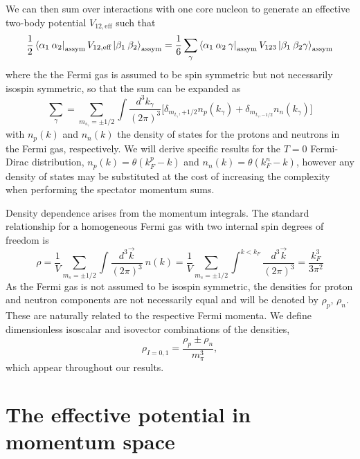 We can then sum over interactions with one core nucleon to generate an effective two-body potential $V_{12,\text{eff}}$ such that
\begin{equation}
\frac{1}{2} \bra{\alpha_1\:\alpha_2}_{\text{assym}}  V_{12,\text{eff}}\ket{\beta_1 \:\beta_2 }_{\text{assym}}=\frac{1}{6} \sum_{\gamma} \bra{\alpha_1\:\alpha_2 \: \gamma}_{\text{assym}} V_{123}  \ket{\beta_1 \:\beta_2 \gamma}_{\text{assym}}
\end{equation}
where the the Fermi gas is assumed to be spin symmetric but not necessarily isospin symmetric, so that the sum can be expanded as
\begin{equation}
\sum_\gamma=\sum_{m_{s_\gamma}=\pm 1/2}\int \frac{d^3k_\gamma}{(2\pi)^3} \Big[\delta_{m_{t_\gamma},+1/2} n_p(k_\gamma) +\delta_{m_{t_\gamma,-1/2}} n_n(k_\gamma) \Big]
\end{equation}
with $n_p(k)$ and $n_n(k)$ the density of states for the protons and neutrons in the Fermi gas, respectively. We will derive specific results for the $T=0$ Fermi-Dirac distribution, $n_p(k)=\theta(k_{F}^{p}-k)$ and $n_n(k)=\theta(k_{F}^{n}-k)$, however any density of states may be substituted at the cost of increasing the complexity when performing the spectator momentum sums.

Density dependence arises from the momentum integrals. The standard relationship for a homogeneous Fermi gas with two internal spin degrees of freedom is 
\begin{equation}\label{eq:kF}
\rho=\frac{1}{V}\sum_{m_{s}=\pm 1/2}\int \frac{d^3\vec{k}}{(2\pi)^3}\:n(k)
=\frac{1}{V}\sum_{m_{s}=\pm 1/2}\int^{k<k_F}\frac{d^3\vec{k}}{(2\pi)^3}=\frac{k_F^3}{3\pi^2}
\end{equation}
As the Fermi gas is not assumed to be isospin symmetric, the densities for proton and neutron components are not necessarily equal and will be denoted by $\rho_p$, $\rho_n$. These are naturally related to the respective Fermi momenta. We define dimensionless isoscalar and isovector combinations of the densities, 
\begin{equation}\label{eq:densities}
\rho_{I=0,1}=\frac{\rho_p\pm\rho_n}{m_\pi^3},
\end{equation}
which appear throughout our results.

\section{\label{sec:momentum}The effective potential in momentum space}

